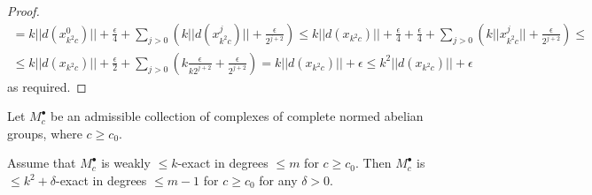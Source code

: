 \begin{proof}
\[\begin{aligned}
= k||d(x^0_{k^2c})|| + \frac{\epsilon}{4} + \sum_{j > 0} (k||d(x^j_{k^2c})|| + \frac{\epsilon}{2^{j+2}}) \leq k||d(x_{k^2c})|| + \frac{\epsilon}{4} + \frac{\epsilon}{4} + \sum_{j > 0} (k||x^j_{k^2c}|| + \frac{\epsilon}{2^{j+2}}) \leq \\
\leq k||d(x_{k^2c})|| + \frac{\epsilon}{2} + \sum_{j > 0} (k\frac{\epsilon}{k2^{j+2}} + \frac{\epsilon}{2^{j+2}}) = k||d(x_{k^2c})|| + \epsilon \leq k^2||d(x_{k^2c})|| + \epsilon
\end{aligned}\]
as required.
\end{proof}

\begin{lemma}
  \label{weakexact_implies_exact}
  Let $M^\bullet_c$ be an admissible collection
  of complexes of complete normed abelian groups, where $c\geq c_0$.

  Assume that $M^\bullet_c$ is weakly $\leq k$-exact in degrees $\leq m$ for $c\geq c_0$.
  Then $M^\bullet_c$ is $\leq k^2 + \delta$-exact in degrees $\leq m-1$ for $c\geq c_0$ for any $\delta > 0$.
\end{lemma}
